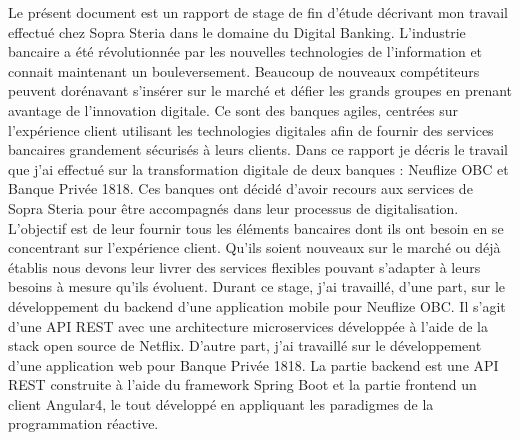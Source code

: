 
	Le présent document est un rapport de stage de fin d'étude décrivant mon travail effectué chez Sopra Steria dans le domaine du Digital Banking. L'industrie bancaire a été révolutionnée par les nouvelles technologies de l'information et connait maintenant un bouleversement. Beaucoup de nouveaux compétiteurs peuvent dorénavant s'insérer sur le marché et défier les grands groupes en prenant avantage de l'innovation digitale. Ce sont des banques agiles, centrées sur l'expérience client utilisant les technologies digitales afin de fournir des services bancaires grandement sécurisés à leurs clients. Dans ce rapport je décris le travail que j'ai effectué sur la transformation digitale de deux banques : Neuflize OBC et Banque Privée 1818. Ces banques ont décidé d'avoir recours aux services de Sopra Steria pour être accompagnés dans leur processus de digitalisation. L'objectif est de leur fournir tous les éléments bancaires dont ils ont besoin en se concentrant sur l'expérience client. Qu'ils soient nouveaux sur le marché ou déjà établis nous devons leur livrer des services flexibles pouvant s'adapter à leurs besoins à mesure qu'ils évoluent. Durant ce stage, j'ai travaillé, d'une part, sur le développement du backend d'une application mobile pour Neuflize OBC. Il s'agit d'une API REST avec une architecture microservices développée à l'aide de la stack open source de Netflix. D'autre part, j'ai travaillé sur le développement d'une application web pour Banque Privée 1818. La partie backend est une API REST construite à l'aide du framework Spring Boot et la partie frontend un client Angular4, le tout développé en appliquant les paradigmes de la programmation réactive.